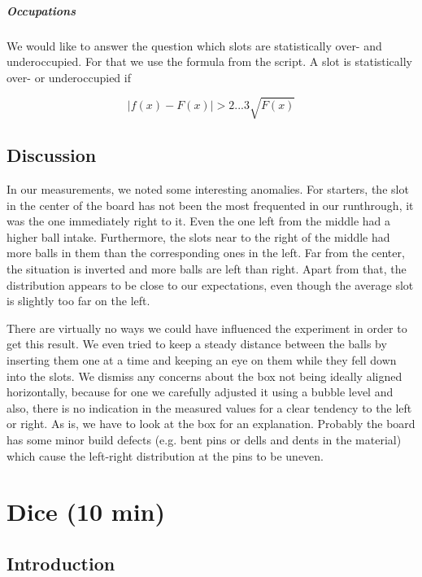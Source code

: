 \documentclass{scrreprt}
\begin{document}
\paragraph*{Occupations}
We would like to answer the question which slots are statistically over- and underoccupied. For that we use the formula from the script. A slot is statistically over- or underoccupied if

\begin{equation*}
\lvert f(x)-F(x) \rvert > 2...3 \sqrt{F(x)}
\end{equation*}

\section{Discussion}
In our measurements, we noted some interesting anomalies. For starters, the slot in the center of the board has not been the most frequented in our runthrough, it was the one immediately right to it. Even the one left from the middle had a higher ball intake. Furthermore, the slots near to the right of the middle had more balls in them than the corresponding ones in the left. Far from the center, the situation is inverted and more balls are left than right. Apart from that, the distribution appears to be close to our expectations, even though the average slot is slightly too far on the left.

There are virtually no ways we could have influenced the experiment in order to get this result. We even tried to keep a steady distance between the balls by inserting them one at a time and keeping an eye on them while they fell down into the slots. We dismiss any concerns about the box not being ideally aligned horizontally, because for one we carefully adjusted it using a bubble level and also, there is no indication in the measured values for a clear tendency to the left or right. As is, we have to look at the box for an explanation. Probably the board has some minor build defects (e.g. bent pins or dells and dents in the material) which cause the left-right distribution at the pins to be uneven.


\chapter[Dice]{Dice (10 min)}

\section{Introduction}
\end{document}
